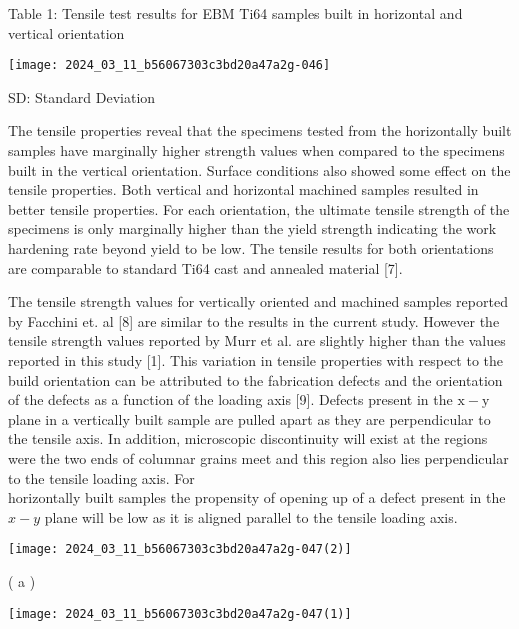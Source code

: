 \documentclass[10pt]{article}
\begin{document}
Table 1: Tensile test results for EBM Ti64 samples built in horizontal and vertical orientation

\begin{center}
\texttt{[image: 2024\_03\_11\_b56067303c3bd20a47a2g-046]}
\end{center}

SD: Standard Deviation

The tensile properties reveal that the specimens tested from the horizontally built samples have marginally higher strength values when compared to the specimens built in the vertical orientation. Surface conditions also showed some effect on the tensile properties. Both vertical and horizontal machined samples resulted in better tensile properties. For each orientation, the ultimate tensile strength of the specimens is only marginally higher than the yield strength indicating the work hardening rate beyond yield to be low. The tensile results for both orientations are comparable to standard Ti64 cast and annealed material [7].

The tensile strength values for vertically oriented and machined samples reported by Facchini et. al [8] are similar to the results in the current study. However the tensile strength values reported by Murr et al. are slightly higher than the values reported in this study [1]. This variation in tensile properties with respect to the build orientation can be attributed to the fabrication defects and the orientation of the defects as a function of the loading axis [9]. Defects present in the $\mathrm{x}-\mathrm{y}$ plane in a vertically built sample are pulled apart as they are perpendicular to the tensile axis. In addition, microscopic discontinuity will exist at the regions were the two ends of columnar grains meet and this region also lies perpendicular to the tensile loading axis. For\\
horizontally built samples the propensity of opening up of a defect present in the $x-y$ plane will be low as it is aligned parallel to the tensile loading axis.

\begin{center}
\texttt{[image: 2024\_03\_11\_b56067303c3bd20a47a2g-047(2)]}
\end{center}

( a )

\begin{center}
\texttt{[image: 2024\_03\_11\_b56067303c3bd20a47a2g-047(1)]}
\end{center}
\end{document}
